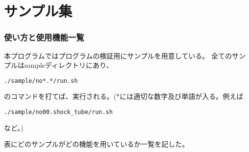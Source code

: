 \documentclass{jsarticle}
\begin{document}
\part{サンプル集}
\newpage
\section{使い方と使用機能一覧}%
本プログラムではプログラムの検証用にサンプルを用意している。
全てのサンプルはsampleディレクトリにあり、
\begin{verbatim}
./sample/no*.*/run.sh
\end{verbatim}
のコマンドを打てば、実行される。(*には適切な数字及び単語が入る。例えば
\begin{verbatim}
./sample/no00.shock_tube/run.sh
\end{verbatim}
など。)

表にどのサンプルがどの機能を用いているか一覧を記した。
\end{document}
